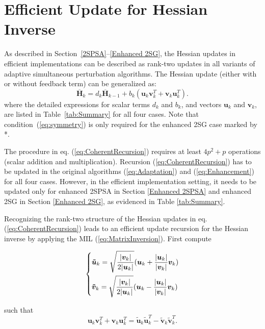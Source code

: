\documentclass[conference,10.3cpt]{IEEEtran}
\newcommand{\oH}{\bm{\overline{H}}}
\begin{document}
\section{Efficient Update for Hessian Inverse} \label{Efficient Update}
As described in Section~\ref{2SPSA}--\ref{Enhanced 2SG}, the
Hessian updates in efficient implementations can be described as rank-two updates in all variants of adaptive simultaneous perturbation algorithms. The Hessian update (either with or without feedback term) can be generalized as:
\begin{equation}
\label{eq:CoherentRecursion}
  \oH_{k}=d_k\oH_{k-1}+b_k(\bm{u}_k \bm{v}_k^{T}+\bm{v}_k \bm{u}_k^{T}).
\end{equation}
where the detailed expressions for scalar terms $d_k$ and $b_k$, and vectors $\bm{u}_k$ and $\bm{v}_k$, are listed in Table~\ref{tab:Summary} for all four cases. Note that
condition~(\ref{eq:symmetry}) is only required for the
enhanced 2SG case marked by *.

The procedure in eq.
(\ref{eq:CoherentRecursion}) requires at least $4p^2 + p$ operations (scalar addition and multiplication). Recursion
(\ref{eq:CoherentRecursion}) has to be updated in the original algorithms (\ref{eq:Adaptation}) and (\ref{eq:Enhancement})
for all four cases. However, in the efficient implementation
setting, it needs to be updated only for enhanced 2SPSA in
Section \ref{Enhanced 2SPSA} and enhanced 2SG in Section
\ref{Enhanced 2SG}, as evidenced in Table \ref{tab:Summary}.

Recognizing the rank-two structure of the Hessian updates in eq. (\ref{eq:CoherentRecursion}) leads to
an efficient update recursion for the Hessian inverse by applying the MIL (\ref{eq:MatrixInversion}). First compute

\begin{equation} \label{eq:Transform}
\begin{dcases}
\bm{\tilde{u}}_k=\sqrt{\frac{|\bm{v}_k|}{2|\bm{u}_k|}} (\bm{u}_k +
\frac{|\bm{u}_k|}{|\bm{v}_k|}\bm{v}_k)\\
\bm{\tilde{v}}_k =
\sqrt{\frac{|\bm{v}_k|}{2|\bm{u}_k|}} (\bm{u}_k -
\frac{|\bm{u}_k|}{|\bm{v}_k|}\bm{v}_k)\\
\end{dcases}
\end{equation}

such that
\begin{equation*} \bm{u}_k \bm{v}_k^{T}+\bm{v}_k \bm{u}_k^{T}
  = \bm{\tilde{u}}_k \bm{\tilde{u}}_k^{T} - \bm{\tilde{v}}_k
  \bm{\tilde{v}}_k^{T}.
\end{equation*}
\end{document}
